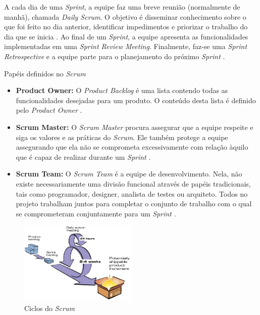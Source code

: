 \documentclass{acm_proc_article-sp}
\begin{document}
A cada dia de uma \textit{Sprint}, a equipe faz uma breve reunião (normalmente de manhã), chamada \textit{Daily Scrum}. O objetivo é disseminar conhecimento sobre o que foi feito no dia anterior, identificar impedimentos e priorizar o trabalho do dia que se inicia \cite{scrum:agil}. Ao final de um \textit{Sprint}, a equipe apresenta as funcionalidades implementadas em uma \textit{Sprint Review Meeting}. Finalmente, faz-se uma \textit{Sprint Retrospective} e a equipe parte para o planejamento do próximo \textit{Sprint} \cite{scrum:agil}.

Papéis definidos no \textit{Scrum}

\begin{itemize}
\item \textbf{Product Owner:}  O \textit{Product Backlog} é uma lista contendo todas as funcionalidades desejadas para um produto. O conteúdo desta lista é definido pelo \textit{Product Owner} \cite{scrum:agil}.
\item \textbf{Scrum Master:} O \textit{Scrum Master} procura assegurar que a equipe respeite e siga os valores e as práticas do \textit{Scrum}. Ele também protege a equipe assegurando que ela não se comprometa excessivamente com relação àquilo que é capaz de realizar durante um \textit{Sprint} \cite{scrum:agil}.
\item \textbf{Scrum Team:} O \textit{Scrum Team} é a equipe de desenvolvimento. Nela, não existe necessariamente uma divisão funcional através de papéis tradicionais, tais como programador, designer, analista de testes ou arquiteto. Todos no projeto trabalham juntos para completar o conjunto de trabalho com o qual se comprometeram conjuntamente para um \textit{Sprint} \cite{scrum:agil}.
\end{itemize}


\begin{figure}[h]
\centering %
\includegraphics[width=0.5\textwidth]{scrumCiclo.JPG} %
\caption{Ciclos do \textit{Scrum} \cite{scrum:agil}}
\end{figure}
\end{document}
